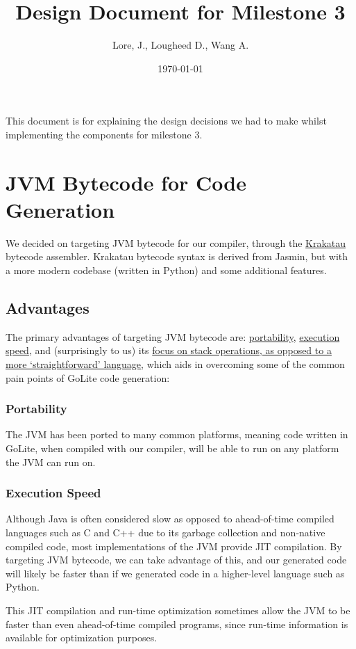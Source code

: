 \documentclass[11pt]{article}
\author{Lore, J., Lougheed D., Wang A.}
\date{\today}
\title{Design Document for Milestone 3}
\begin{document}
\maketitle
\tableofcontents

This document is for explaining the design decisions we had to make
whilst implementing the components for milestone 3.  \newpage
\section{JVM Bytecode for Code Generation}
\label{sec:org33f9c5e}
We decided on targeting JVM bytecode for our compiler, through the
\href{https://github.com/Storyyeller/Krakatau}{Krakatau}
bytecode assembler. Krakatau bytecode syntax is derived from Jasmin, but with
a more modern codebase (written in Python) and some additional features.
\subsection{Advantages}
\label{sec:org117685c}
The primary advantages of targeting JVM bytecode are:
\hyperref[sec:orgcbf8cfe]{portability}, \hyperref[sec:org7a71ad3]{execution speed},
and (surprisingly to us) its \hyperref[sec:org3b8ffc9]{focus on stack
operations, as opposed to a more `straightforward' language}, which
aids in overcoming some of the common pain points of GoLite code
generation:
\subsubsection{Portability}
\label{sec:orgcbf8cfe}
The JVM has been ported to many common platforms, meaning code written in
GoLite, when compiled with our compiler, will be able to run on any
platform the JVM can run on.
\subsubsection{Execution Speed}
\label{sec:org7a71ad3}
Although Java is often considered slow as opposed to ahead-of-time compiled
languages such as C and C++ due to its garbage collection and non-native
compiled code, most implementations of the JVM provide JIT compilation.
By targeting JVM bytecode, we can take advantage of this, and our generated
code will likely be faster than if we generated code in a higher-level
language such as Python.

This JIT compilation and run-time optimization sometimes allow
the JVM to be faster than even ahead-of-time compiled programs, since
run-time information is available for optimization purposes.
\end{document}
